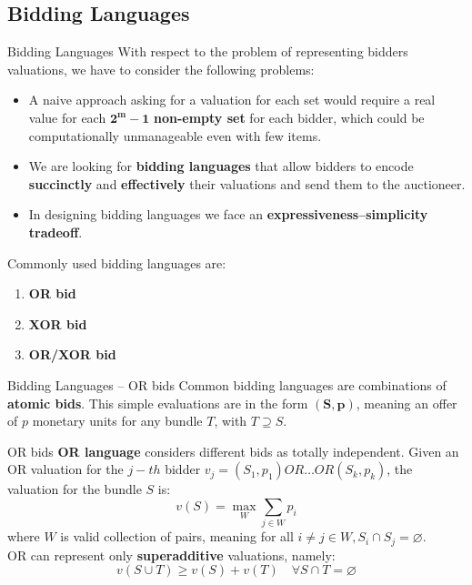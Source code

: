 \documentclass[aspectratio=169,xcolor=dvipsnames]{beamer}
\begin{document}
    \subsection{Bidding Languages}
    \begin{frame}{Bidding Languages}
    With respect to the problem of representing bidders valuations, we have to consider the following problems:
        \begin{itemize}
        \item A naive approach asking for a valuation for each set would require a real value for each $\mathbf{2^m -1}$ \textbf{non-empty set} for each bidder, which could be computationally unmanageable even with few items.
        \item We are looking for \textbf{bidding languages} that allow bidders to encode \textbf{succinctly} and  \textbf{effectively} their valuations and send them to the auctioneer. 
        \item In designing bidding languages we face an \textbf{expressiveness–simplicity tradeoff}.
    \end{itemize}
\pause
    Commonly used bidding languages are:
            \begin{enumerate}
                \item \textbf{OR bid}
                \item \textbf{XOR bid}
                \item \textbf{OR/XOR bid}
            \end{enumerate}
    \end{frame}
    
    \begin{frame}{Bidding Languages – OR bids}
    Common bidding languages are combinations of \textbf{atomic bids}. This simple evaluations are in the form $\boldsymbol{(S,p)}$, meaning an offer of $p$ monetary units for any bundle $T$, with $T \supseteq S$.
\pause
    \begin{block}{OR bids}
    \textbf{OR language} considers different bids as totally independent. Given an OR valuation for the $j-th$ bidder $v_{j} = (S_1, p_{1})OR \dotsc OR  (S_k, p_{k})$, the valuation for the bundle $S$ is:  
    $$
    v(S) = \max_{W} \sum_{j \in W} p_i
    $$
    where $W$ is valid collection of pairs, meaning for all $i \neq j \in W, S_i \cap S_j = \varnothing$. \\
    \smallskip
\pause
    OR can represent only \textbf{superadditive} valuations, namely:
    $$
     v(S \cup T) \geq v(S) + v(T) \quad \forall S \cap T = \varnothing
    $$
    \end{block}
    \end{frame}
    
\end{document}
